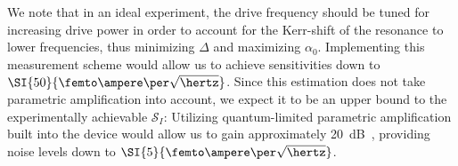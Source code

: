 % 
We note that in an ideal experiment, the drive frequency should be tuned for increasing drive power in order to account for the Kerr-shift of the resonance to lower frequencies, thus minimizing $\Delta$ and maximizing $\alpha_0$.
% 
Implementing this measurement scheme would allow us to achieve sensitivities down to $\SI{50}{\femto\ampere\per\sqrt{\hertz}}$.
% 
Since this estimation does not take parametric amplification into account, we expect it to be an upper bound to the experimentally achievable $\mathcal{S}_I$:
% 
Utilizing quantum-limited parametric amplification built into the device would allow us to gain approximately \SI{20}{dB}~\cite{stehlikFastChargeSensing2015,pogorzalekHystereticFluxResponse2017,planatUnderstandingSaturationPower2019}, providing noise levels down to $\SI{5}{\femto\ampere\per\sqrt{\hertz}}$.

